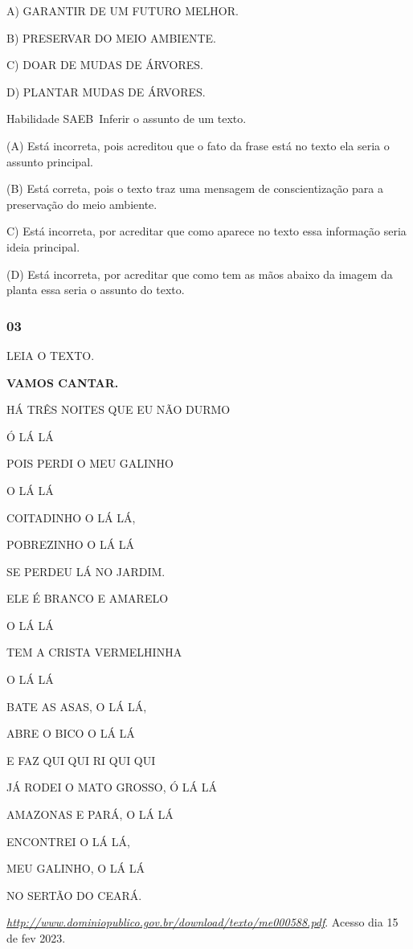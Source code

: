 \begin{escola}
A) GARANTIR DE UM FUTURO MELHOR.

B) PRESERVAR DO MEIO AMBIENTE.

C) DOAR DE MUDAS DE ÁRVORES.

D) PLANTAR MUDAS DE ÁRVORES.

\protect\hypertarget{_heading=h.qsh70q}{}{}Habilidade SAEB~Inferir o
assunto de um texto.

(A) Está incorreta, pois acreditou que o fato da frase está no texto ela
seria o assunto principal.

(B) Está correta, pois o texto traz uma mensagem de conscientização para
a preservação do meio ambiente.

C) Está incorreta, por acreditar que como aparece no texto essa
informação seria ideia principal.

(D) Está incorreta, por acreditar que como tem as mãos abaixo da imagem
da planta essa seria o assunto do texto.

\subsubsection{03 }\label{section-18}

LEIA O TEXTO.

\textbf{VAMOS CANTAR.}

HÁ TRÊS NOITES QUE EU NÃO DURMO

Ó LÁ LÁ

POIS PERDI O MEU GALINHO

O LÁ LÁ

COITADINHO O LÁ LÁ,

POBREZINHO O LÁ LÁ

SE PERDEU LÁ NO JARDIM.

ELE É BRANCO E AMARELO

O LÁ LÁ

TEM A CRISTA VERMELHINHA

O LÁ LÁ

BATE AS ASAS, O LÁ LÁ,

ABRE O BICO O LÁ LÁ

E FAZ QUI QUI RI QUI QUI

JÁ RODEI O MATO GROSSO, Ó LÁ LÁ

AMAZONAS E PARÁ, O LÁ LÁ

ENCONTREI O LÁ LÁ,

MEU GALINHO, O LÁ LÁ

NO SERTÃO DO CEARÁ.

\href{http://www.dominiopublico.gov.br/download/texto/me000588.pdf}{\emph{http://www.dominiopublico.gov.br/download/texto/me000588.pdf}}.
Acesso dia 15 de fev 2023.


\end{escola}
